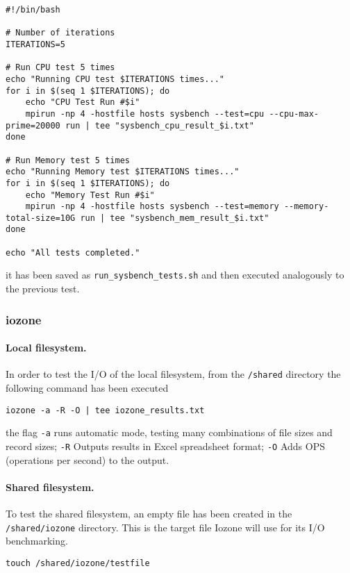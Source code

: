 \begin{verbatim}
#!/bin/bash

# Number of iterations
ITERATIONS=5

# Run CPU test 5 times
echo "Running CPU test $ITERATIONS times..."
for i in $(seq 1 $ITERATIONS); do
    echo "CPU Test Run #$i"
    mpirun -np 4 -hostfile hosts sysbench --test=cpu --cpu-max-prime=20000 run | tee "sysbench_cpu_result_$i.txt"
done

# Run Memory test 5 times
echo "Running Memory test $ITERATIONS times..."
for i in $(seq 1 $ITERATIONS); do
    echo "Memory Test Run #$i"
    mpirun -np 4 -hostfile hosts sysbench --test=memory --memory-total-size=10G run | tee "sysbench_mem_result_$i.txt"
done

echo "All tests completed."
\end{verbatim}

it has been saved as \texttt{run\_sysbench\_tests.sh} and then executed analogously to the previous test.

\subsubsection{iozone}

\paragraph{Local filesystem.} In order to test the I/O of the local filesystem, from the \texttt{/shared} directory the following command has been executed

\begin{verbatim}
iozone -a -R -O | tee iozone_results.txt
\end{verbatim}

the flag \texttt{-a} runs automatic mode, testing many combinations of file sizes and record sizes; \texttt{-R} Outputs results in Excel spreadsheet format; \texttt{-O} Adds OPS (operations per second) to the output.

\paragraph{Shared filesystem.} To test the shared filesystem, an empty file has been created in the \texttt{/shared/iozone} directory. This is the target file Iozone will use for its I/O benchmarking.

\begin{verbatim}
touch /shared/iozone/testfile
\end{verbatim}

